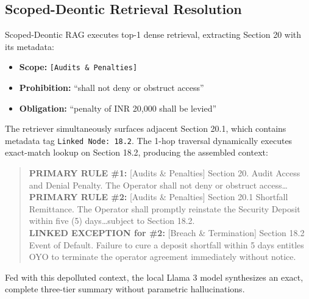 \documentclass[conference]{IEEEtran}
\begin{document}
\subsection{Scoped-Deontic Retrieval Resolution}
Scoped-Deontic RAG executes top-1 dense retrieval, extracting Section 20 with its metadata:
\begin{itemize}
    \item \textbf{Scope:} \texttt{[Audits \& Penalties]}
    \item \textbf{Prohibition:} ``shall not deny or obstruct access''
    \item \textbf{Obligation:} ``penalty of INR 20,000 shall be levied''
\end{itemize}
The retriever simultaneously surfaces adjacent Section 20.1, which contains metadata tag \texttt{Linked Node: 18.2}. The 1-hop traversal dynamically executes exact-match lookup on Section 18.2, producing the assembled context:
\begin{quote}
\small
\textbf{PRIMARY RULE \#1:} [Audits \& Penalties] Section 20. Audit Access and Denial Penalty. The Operator shall not deny or obstruct access\dots \\
\textbf{PRIMARY RULE \#2:} [Audits \& Penalties] Section 20.1 Shortfall Remittance. The Operator shall promptly reinstate the Security Deposit within five (5) days\dots subject to Section 18.2. \\
\textbf{LINKED EXCEPTION for \#2:} [Breach \& Termination] Section 18.2 Event of Default. Failure to cure a deposit shortfall within 5 days entitles OYO to terminate the operator agreement immediately without notice.
\end{quote}

Fed with this depolluted context, the local Llama 3 model synthesizes an exact, complete three-tier summary without parametric hallucinations.
\end{document}
